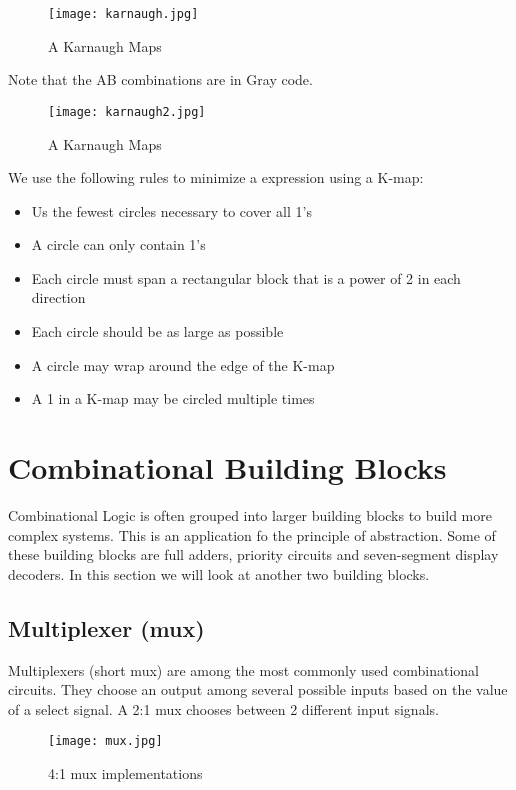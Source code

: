 \begin{figure}[h]
    \centering
    \texttt{[image: karnaugh.jpg]}
    \caption{A Karnaugh Maps}
\end{figure}

Note that the AB combinations are in Gray code.

\begin{figure}[h]
    \centering
    \texttt{[image: karnaugh2.jpg]}
    \caption{A Karnaugh Maps}
\end{figure}

We use the following rules to minimize a expression using a K-map:
\begin{itemize}
    \item Us the fewest circles necessary to cover all 1's
    \item A circle can only contain 1's
    \item Each circle must span a rectangular block that is a power of 2 in each direction
    \item Each circle should be as large as possible
    \item A circle may wrap around the edge of the K-map
    \item A 1 in a K-map may be circled multiple times
\end{itemize}

\section{Combinational Building Blocks}
Combinational Logic is often grouped into larger building blocks to build more complex systems. This is an application fo the
principle of abstraction. Some of these building blocks are full adders, priority circuits and seven-segment display decoders.
In this section we will look at another two building blocks.

\subsection{Multiplexer (mux)}

Multiplexers (short mux) are among the most commonly used combinational circuits. They choose an output among 
several possible inputs based on the value of a select signal. A 2:1 mux chooses between 2 different input signals.

\begin{figure}[h]
    \centering
    \texttt{[image: mux.jpg]}
    \caption{4:1 mux implementations}
\end{figure}

